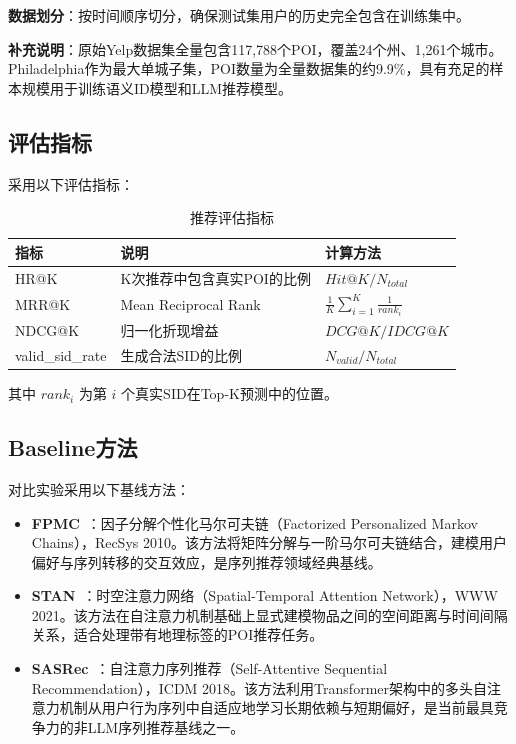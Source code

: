 \textbf{数据划分}：按时间顺序切分，确保测试集用户的历史完全包含在训练集中。

\textbf{补充说明}：原始Yelp数据集全量包含117,788个POI，覆盖24个州、1,261个城市。Philadelphia作为最大单城子集，POI数量为全量数据集的约9.9\%，具有充足的样本规模用于训练语义ID模型和LLM推荐模型。

\subsection{评估指标}
\label{sec:eval_metrics}

采用以下评估指标：

\begin{table}[htbp]
\centering
\caption{推荐评估指标}
\label{tab:eval_metrics}
\begin{tabular}{lll}
\toprule
指标 & 说明 & 计算方法 \\
\midrule
HR@K & K次推荐中包含真实POI的比例 & $Hit@K / N_{total}$ \\
MRR@K & Mean Reciprocal Rank & $\frac{1}{K}\sum_{i=1}^{K}\frac{1}{rank_i}$ \\
NDCG@K & 归一化折现增益 & $DCG@K / IDCG@K$ \\
valid\_sid\_rate & 生成合法SID的比例 & $N_{valid} / N_{total}$ \\
\bottomrule
\end{tabular}
\end{table}

其中 $rank_i$ 为第 $i$ 个真实SID在Top-K预测中的位置。

\subsection{Baseline方法}
\label{sec:baseline_methods}

对比实验采用以下基线方法：

\begin{itemize}
    \item \textbf{FPMC}~\cite{rendle2010factorifying}：因子分解个性化马尔可夫链（Factorized Personalized Markov Chains），RecSys 2010。该方法将矩阵分解与一阶马尔可夫链结合，建模用户偏好与序列转移的交互效应，是序列推荐领域经典基线。
    \item \textbf{STAN}~\cite{wang2021spatial}：时空注意力网络（Spatial-Temporal Attention Network），WWW 2021。该方法在自注意力机制基础上显式建模物品之间的空间距离与时间间隔关系，适合处理带有地理标签的POI推荐任务。
    \item \textbf{SASRec}~\cite{kang2018self}：自注意力序列推荐（Self-Attentive Sequential Recommendation），ICDM 2018。该方法利用Transformer架构中的多头自注意力机制从用户行为序列中自适应地学习长期依赖与短期偏好，是当前最具竞争力的非LLM序列推荐基线之一。
\end{itemize}

